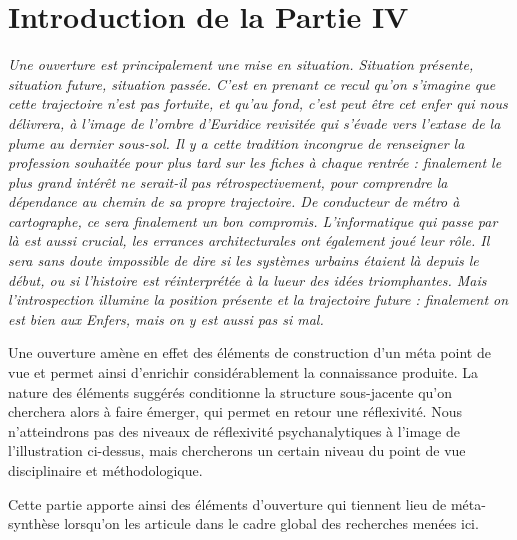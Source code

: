 





\chapter*{Introduction de la Partie IV}







\textit{Une ouverture est principalement une mise en situation. Situation présente, situation future, situation passée. C'est en prenant ce recul qu'on s'imagine que cette trajectoire n'est pas fortuite, et qu'au fond, c'est peut être cet enfer qui nous délivrera, à l'image de l'ombre d'Euridice revisitée qui s'évade vers l'extase de la plume au dernier sous-sol. Il y a cette tradition incongrue de renseigner la profession souhaitée pour plus tard sur les fiches à chaque rentrée : finalement le plus grand intérêt ne serait-il pas rétrospectivement, pour comprendre la dépendance au chemin de sa propre trajectoire. De conducteur de métro à cartographe, ce sera finalement un bon compromis. L'informatique qui passe par là est aussi crucial, les errances architecturales ont également joué leur rôle. Il sera sans doute impossible de dire si les systèmes urbains étaient là depuis le début, ou si l'histoire est réinterprétée à la lueur des idées triomphantes. Mais l'introspection illumine la position présente et la trajectoire future : finalement on est bien aux Enfers, mais on y est aussi pas si mal.}


\bigskip

Une ouverture amène en effet des éléments de construction d'un méta point de vue et permet ainsi d'enrichir considérablement la connaissance produite. La nature des éléments suggérés conditionne la structure sous-jacente qu'on cherchera alors à faire émerger, qui permet en retour une réflexivité. Nous n'atteindrons pas des niveaux de réflexivité psychanalytiques à l'image de l'illustration ci-dessus, mais chercherons un certain niveau du point de vue disciplinaire et méthodologique.

Cette partie apporte ainsi des éléments d'ouverture qui tiennent lieu de méta-synthèse lorsqu'on les articule dans le cadre global des recherches menées ici.

